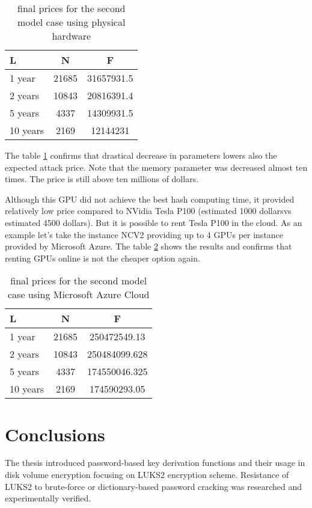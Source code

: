 \documentclass[nolof]{fithesis3}
\begin{document}
\noindent
\begin{table}
\caption{final prices for the second model case using physical hardware}
\label{tab:at5}
\begin{tabularx}{\textwidth}{| l | c | c |}
\hline
L & N & F\\
\hline
1 year & 21685 & 31657931.5\\
\hline
2 years & 10843 & 20816391.4\\
\hline
5 years & 4337 & 14309931.5\\
\hline
10 years & 2169 & 12144231\\
\hline
\end{tabularx}
\end{table}

The table \ref{tab:at5} confirms that drastical decrease in parameters lowers also the expected attack price. Note that the memory parameter was decreased almost ten times. The price is still above ten millions of dollars.

Although this GPU did not achieve the best hash computing time, it provided relatively low price compared to NVidia Tesla P100 (estimated 1000  dollarsvs estimated 4500 dollars). But it is possible to rent Tesla P100 in the cloud. As an example let's take the instance NCV2 providing up to 4 GPUs per instance provided by Microsoft Azure. The table \ref{tab:at6} shows the results and confirms that renting GPUs online is not the cheaper option again.

\noindent
\begin{table}
\caption{final prices for the second model case using Microsoft Azure Cloud}
\label{tab:at6}
\begin{tabularx}{\textwidth}{| l | c | c |}
\hline
L & N & F\\
\hline
1 year & 21685 & 250472549.13\\
\hline
2 years & 10843 & 250484099.628\\
\hline
5 years & 4337 & 174550046.325\\
\hline
10 years & 2169 & 174590293.05\\
\hline
\end{tabularx}
\end{table}




\chapter{Conclusions}
The thesis introduced password-based key derivation functions and their usage in disk volume encryption focusing on LUKS2 encryption scheme. Resistance of LUKS2 to brute-force or dictionary-based password cracking was researched and experimentally verified.
\end{document}
